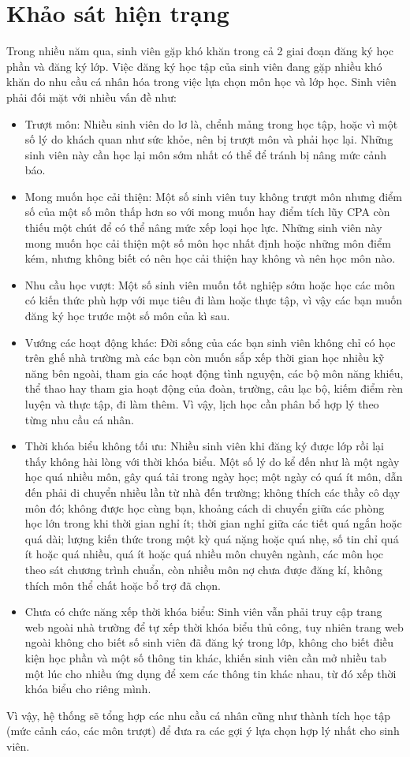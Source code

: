 \documentclass[12pt,a4paper]{report}
\begin{document}
\section{Khảo sát hiện trạng}
Trong nhiều năm qua, sinh viên gặp khó khăn trong cả 2 giai đoạn đăng ký học phần và đăng ký lớp. Việc đăng ký học tập của sinh viên đang gặp nhiều khó khăn do nhu cầu cá nhân hóa trong việc lựa chọn môn học và lớp học. Sinh viên phải đối mặt với nhiều vấn đề như:
\begin{itemize}
    \item Trượt môn: Nhiều sinh viên do lơ là, chểnh mảng trong học tập, hoặc vì một số lý do khách quan như sức khỏe, nên bị trượt môn và phải học lại. Những sinh viên này cần học lại môn sớm nhất có thể để tránh bị nâng mức cảnh báo.
    \item Mong muốn học cải thiện: Một số sinh viên tuy không trượt môn nhưng điểm số của một số môn thấp hơn so với mong muốn hay điểm tích lũy CPA còn thiếu một chút để có thể nâng mức xếp loại học lực. Những sinh viên này mong muốn học cải thiện một số môn học nhất định hoặc những môn điểm kém, nhưng không biết có nên học cải thiện hay không và nên học môn nào.
    \item Nhu cầu học vượt: Một số sinh viên muốn tốt nghiệp sớm hoặc học các môn có kiến thức phù hợp với mục tiêu đi làm hoặc thực tập, vì vậy các bạn muốn đăng ký học trước một số môn của kì sau.
    \item Vướng các hoạt động khác: Đời sống của các bạn sinh viên không chỉ có học trên ghế nhà trường mà các bạn còn muốn sắp xếp thời gian học nhiều kỹ năng bên ngoài, tham gia các hoạt động tình nguyện, các bộ môn năng khiếu, thể thao hay tham gia hoạt động của đoàn, trường, câu lạc bộ, kiếm điểm rèn luyện và thực tập, đi làm thêm. Vì vậy, lịch học cần phân bổ hợp lý theo từng nhu cầu cá nhân.
    \item Thời khóa biểu không tối ưu: Nhiều sinh viên khi đăng ký được lớp rồi lại thấy không hài lòng với thời khóa biểu. Một số lý do kể đến như là một ngày học quá nhiều môn, gây quá tải trong ngày học; một ngày có quá ít môn, dẫn đến phải di chuyển nhiều lần từ nhà đến trường; không thích các thầy cô dạy môn đó; không được học cùng bạn, khoảng cách di chuyển giữa các phòng học lớn trong khi thời gian nghỉ ít; thời gian nghỉ giữa các tiết quá ngắn hoặc quá dài; lượng kiến thức trong một kỳ quá nặng hoặc quá nhẹ, số tin chỉ quá ít hoặc quá nhiều, quá ít hoặc quá nhiều môn chuyên ngành, các môn học theo sát chương trình chuẩn, còn nhiều môn nợ chưa được đăng kí, không thích môn thể chất hoặc bổ trợ đã chọn.
    \item Chưa có chức năng xếp thời khóa biểu: Sinh viên vẫn phải truy cập trang web ngoài nhà trường để tự xếp thời khóa biểu thủ công, tuy nhiên trang web ngoài không cho biết số sinh viên đã đăng ký trong lớp, không cho biết điều kiện học phần và một số thông tin khác, khiến sinh viên cần mở nhiều tab một lúc cho nhiều ứng dụng để xem các thông tin khác nhau, từ đó xếp thời khóa biểu cho riêng mình.
\end{itemize}
Vì vậy, hệ thống sẽ tổng hợp các nhu cầu cá nhân cũng như thành tích học tập (mức cảnh cáo, các môn trượt) để đưa ra các gợi ý lựa chọn hợp lý nhất cho sinh viên.
\end{document}
